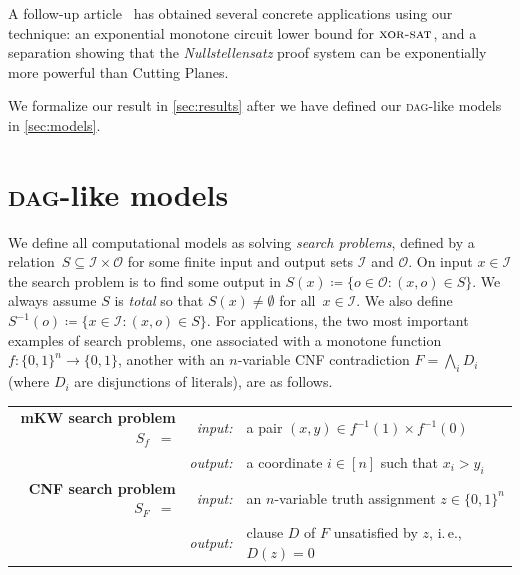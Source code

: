 \documentclass[11pt]{article}
\numberwithin{equation}{section}
\theoremstyle{definition}
\theoremstyle{plain}
\newcommand{\ie}{i.\,e.}
\newcommand{\DAG}{\textsc{dag}}
\newcommand{\XorSat}{\textsc{xor-sat}}
\newcommand{\calI}{\mathcal{I}}
\newcommand{\calO}{\mathcal{O}}
\begin{document}
A follow-up
%
article~\cite{goos19monotone}   %
has obtained several concrete applications using our technique: an exponential monotone circuit lower bound for $\XorSat$, and a separation showing that the \emph{Nullstellensatz} proof system can be exponentially more powerful than Cutting Planes.


We formalize our result in \autoref{sec:results} after we have defined our \DAG-like models in \autoref{sec:models}.

\section{\DAG-like models} \label{sec:models}

We define all computational models as solving \emph{search problems}, defined by a relation~$S\subseteq\calI\times\calO$ for some finite input and output sets $\calI$ and $\calO$. On input $x\in\calI$ the search problem is to find some output in $S(x)\coloneqq\{o\in \calO : (x,o)\in S\}$. We always assume $S$ is \emph{total} so that $S(x)\neq\emptyset$ for all~$x\in\calI$. We also define $S^{-1}(o)\coloneqq\{x\in\calI : (x,o)\in S\}$. For applications, the two most important examples of search problems, one associated with a monotone function~$f\colon\{0,1\}^n\to\{0,1\}$, another with an $n$-variable CNF contradiction $F=\bigwedge_i D_i$ (where $D_i$ are disjunctions of literals), are as follows.
\begin{mdframed}
\begin{center}
\setlength\tabcolsep{1.5mm}
\begin{tabular}{rrl}
\bf mKW search problem $S_f\enspace=$&
\slshape input: & a pair $(x,y)\in f^{-1}(1)\times f^{-1}(0)$\\
&\slshape output:& a coordinate $i\in[n]$ such that $x_i>y_i$\\[3mm]
\bf CNF search problem $S_F\enspace=$&
\slshape input: & an $n$-variable truth assignment $z\in\{0,1\}^n$\\
&\slshape output: & clause $D$ of $F$ unsatisfied by $z$, \ie, $D(z)=0$
\end{tabular}
\end{center}
\end{mdframed}
\end{document}
